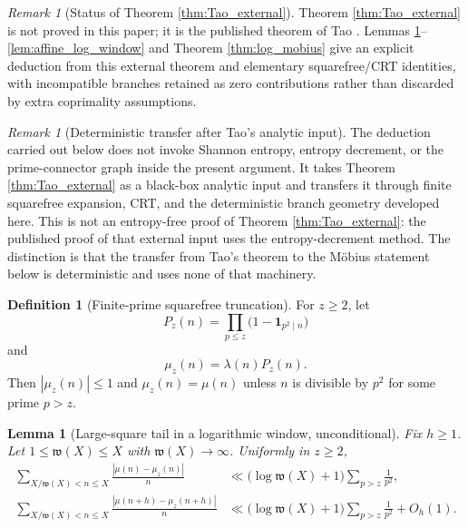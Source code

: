 \documentclass[11pt]{amsart}
\numberwithin{equation}{section}
\theoremstyle{plain}
\newtheorem{lemma}[theorem]{Lemma}
\theoremstyle{definition}
\newtheorem{definition}[theorem]{Definition}
\theoremstyle{remark}
\newtheorem{remark}[theorem]{Remark}
\newcommand{\one}{\mathbf 1}
\newcommand{\mob}{\mu}
\newcommand{\liou}{\lambda}
\newcommand{\what}{\mathfrak w}
\begin{document}
\begin{remark}[Status of Theorem \ref{thm:Tao_external}]
\label{rem:Tao_status}
Theorem \ref{thm:Tao_external} is not proved in this paper; it is the published theorem of Tao \cite{Tao2016}.  Lemmas \ref{lem:truncated_squarefree_tail}--\ref{lem:affine_log_window} and Theorem \ref{thm:log_mobius} give an explicit deduction from this external theorem and elementary squarefree/CRT identities, with incompatible branches retained as zero contributions rather than discarded by extra coprimality assumptions.
\end{remark}

\begin{remark}[Deterministic transfer after Tao's analytic input]
\label{rem:Tao_deterministic_transfer}
The deduction carried out below does not invoke Shannon entropy, entropy decrement, or the prime-connector graph inside the present argument.  It takes Theorem \ref{thm:Tao_external} as a black-box analytic input and transfers it through finite squarefree expansion, CRT, and the deterministic branch geometry developed here.  This is not an entropy-free proof of Theorem \ref{thm:Tao_external}: the published proof of that external input uses the entropy-decrement method.  The distinction is that the transfer from Tao's theorem to the Möbius statement below is deterministic and uses none of that machinery.
\end{remark}

\begin{definition}[Finite-prime squarefree truncation]
\label{def:mu_z}
For $z\ge2$, let
\begin{equation}
P_z(n)=\prod_{p\le z}\bigl(1-\one_{p^2\mid n}\bigr)
\label{eq:Pz_definition}
\end{equation}
and
\begin{equation}
\mob_z(n)=\liou(n)P_z(n).
\label{eq:mu_z_definition}
\end{equation}
Then $|\mob_z(n)|\le1$ and $\mob_z(n)=\mob(n)$ unless $n$ is divisible by $p^2$ for some prime $p>z$.
\end{definition}

\begin{lemma}[Large-square tail in a logarithmic window, unconditional]
\label{lem:truncated_squarefree_tail}
Fix $h\ge1$.  Let $1\le\what(X)\le X$ with $\what(X)\to\infty$.  Uniformly in $z\ge2$,
\begin{align}
\sum_{X/\what(X)<n\le X}
\frac{|\mob(n)-\mob_z(n)|}{n}
&\ll
\bigl(\log\what(X)+1\bigr)
\sum_{p>z}\frac1{p^2},
\label{eq:mu_tail_unshifted}\\
\sum_{X/\what(X)<n\le X}
\frac{|\mob(n+h)-\mob_z(n+h)|}{n}
&\ll
\bigl(\log\what(X)+1\bigr)
\sum_{p>z}\frac1{p^2}+O_h(1).
\label{eq:mu_tail_shifted}
\end{align}
\end{lemma}
\end{document}

